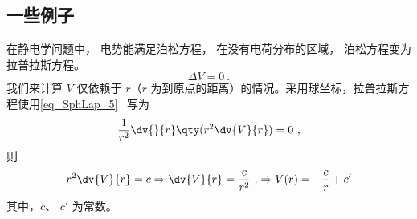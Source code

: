 \subsection{一些例子}
\begin{example}{}
在静电学问题中， 电势能满足泊松方程， 在没有电荷分布的区域， 泊松方程变为拉普拉斯方程。
\begin{equation}
\Delta V=0~.
\end{equation}
我们来计算 $V$ 仅依赖于 $r$（$r$ 为到原点的距离）的情况。采用球坐标，拉普拉斯方程使用\autoref{eq_SphLap_5}~ 写为
\begin{equation}
\frac{1}{r^2}\dv{}{r}\qty(r^2\dv{V}{r})=0~,
\end{equation}
则
\begin{equation}
r^2\dv{V}{r}=c\Rightarrow \dv{V}{r}=\frac{c}{r^2}~.
\Rightarrow V(r)=-\frac{c}{r}+c'
\end{equation}
其中，$c$、 $c'$ 为常数。
\end{example}
